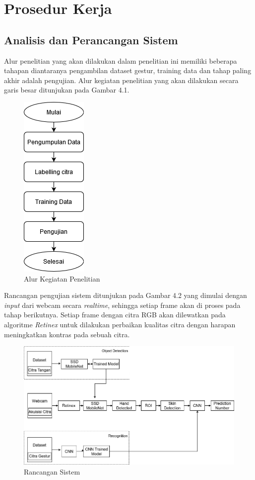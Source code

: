 \section{Prosedur Kerja}
\subsection{Analisis dan Perancangan Sistem}
Alur penelitian yang akan dilakukan dalam penelitian ini memiliki beberapa tahapan diantaranya pengambilan dataset gestur, training data dan tahap paling akhir adalah pengujian. Alur kegiatan penelitian yang akan dilakukan secara garis besar ditunjukan pada Gambar 4.1.
\begin{figure}[H]
	\centering
	\includegraphics[width=0.2\linewidth]{Rencana}
	\caption{Alur Kegiatan Penelitian}
	\label{fig:screenshot006}
\end{figure}
Rancangan pengujian sistem ditunjukan pada Gambar 4.2 yang dimulai dengan \emph{input} dari webcam secara \emph{realtime}, sehingga setiap frame akan di proses pada tahap berikutnya.
Setiap frame dengan citra RGB akan dilewatkan pada algoritme \emph{Retinex} untuk dilakukan perbaikan kualitas citra dengan harapan meningkatkan kontras pada sebuah citra.
\begin{figure}[H]
	\centering
	\includegraphics[width=1.1\linewidth]{rancanganedit}
	\caption{Rancangan Sistem}
	\label{fig:rancangan}
\end{figure}
